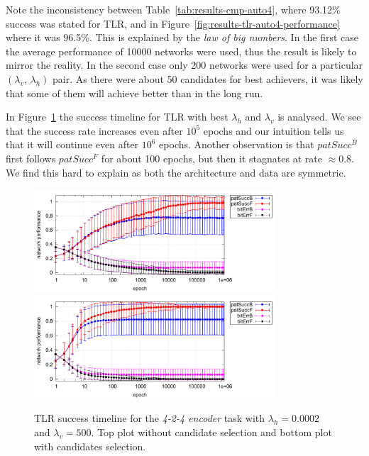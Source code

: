 Note the inconsistency between Table~\ref{tab:results-cmp-auto4}, where 93.12\% success was stated for TLR, and in Figure~\ref{fig:results-tlr-auto4-performance} where it was 96.5\%. This is explained by the \emph{law of big numbers}. In the first case the average performance of 10000 networks were used, thus the result is likely to mirror the reality. In the second case only 200 networks were used for a particular $(\lambda_v,\,\lambda_h)$ pair. As there were about 50 candidates for best achievers, it was likely that some of them will achieve better than in the long run. 

\label{sec:our-o-fb-dist-diff}
In Figure~\ref{fig:results-tlr-auto4-epoch} the success timeline for TLR with best $\lambda_h$ and $\lambda_v$ is analysed. We see that the success rate increases even after $10^5$ epochs and our intuition tells us that it will continue even after $10^6$ epochs. Another observation is that $patSucc^B$ first follows $patSucc^F$ for about 100 epochs, but then it stagnates at rate $\approx0.8$. We find this hard to explain as both the architecture and data are symmetric. %

\begin{figure}[h]
  \centering
  \includegraphics[width=0.8\textwidth]{img/tlr-auto4-best-perf.pdf}\\
  \includegraphics[width=0.8\textwidth]{img/tlr-auto4-best-can.pdf}      
  \caption{TLR success timeline for the \emph{4-2-4 encoder} task with $\lambda_h=0.0002$ and $\lambda_v=500$. Top plot without candidate selection and bottom plot with candidates selection.}
  \label{fig:results-tlr-auto4-epoch} 
\end{figure}

